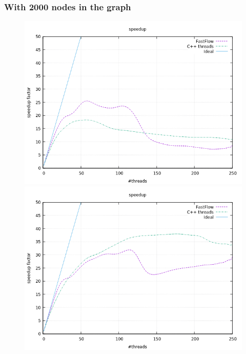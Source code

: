 \documentclass[a4paper,10pt]{article}
\begin{document}
		\subsubsection{With 2000 nodes in the graph}
	\begin{figure}[H]
		\centering
		\begin{minipage}[t]{0.32\linewidth}
			\includegraphics[width=\linewidth]{BenchMarkTSP/speedup/2000/SU2000500_zoom.png}
			\subcaption{}
		\end{minipage}%
		\begin{minipage}[t]{0.32\linewidth}
			\includegraphics[width=\linewidth]{BenchMarkTSP/speedup/2000/SU20005000_zoom.png}
			\subcaption{}
		\end{minipage}

\end{figure}
\end{document}
